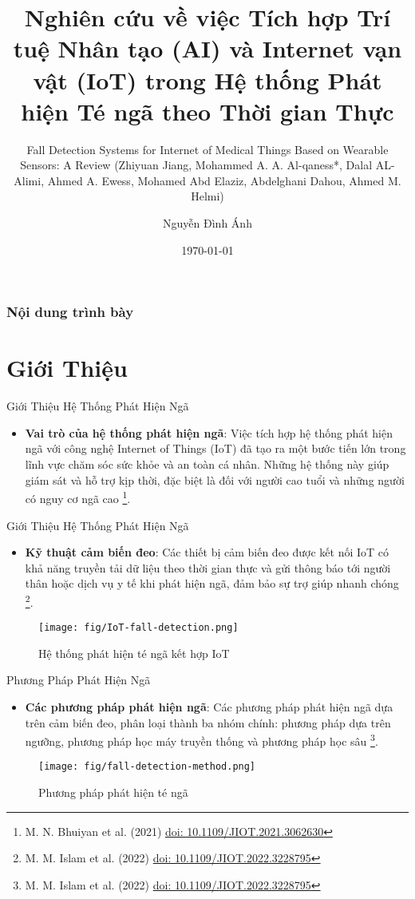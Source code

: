 \documentclass{beamer}
\title[Fall Detection System]
{Nghiên cứu về việc Tích hợp Trí tuệ Nhân tạo (AI) và Internet vạn vật (IoT) trong Hệ thống Phát hiện Té ngã theo Thời gian Thực}
\subtitle{Fall Detection Systems for Internet of Medical Things Based on Wearable Sensors: A Review (Zhiyuan Jiang, Mohammed A. A. Al-qaness*, Dalal AL-Alimi, Ahmed A. Ewess, Mohamed Abd Elaziz, Abdelghani Dahou, Ahmed M. Helmi)}
\author[Nguyen Dinh Anh] %
{Nguyễn Đình Ánh}
\institute[HUTECH] %
{
  Bộ môn Công nghệ phần mềm \\
  Khoa Công nghệ Thông tin\\
  Đại học Công nghệ TP. Hồ Chí Minh (HUTECH)
}
\date[HUTECH 2024] %
{\today}
\newcommand*{\doi}[1]{\href{http://dx.doi.org/#1}{doi: #1}}
\begin{document}
\frame{\titlepage}

\begin{frame}
\frametitle{Nội dung trình bày}
\tableofcontents
\end{frame}


\section{Giới Thiệu}
\begin{frame}{Giới Thiệu Hệ Thống Phát Hiện Ngã}
    \begin{itemize}
    \item \textbf{Vai trò của hệ thống phát hiện ngã}: Việc tích hợp hệ thống phát hiện ngã với công nghệ Internet of Things (IoT) đã tạo ra một bước tiến lớn trong lĩnh vực chăm sóc sức khỏe và an toàn cá nhân. Những hệ thống này giúp giám sát và hỗ trợ kịp thời, đặc biệt là đối với người cao tuổi và những người có nguy cơ ngã cao \footnote{M. N. Bhuiyan et al. (2021) \doi{10.1109/JIOT.2021.3062630}}.      
    \end{itemize}    
\end{frame}

\begin{frame}{Giới Thiệu Hệ Thống Phát Hiện Ngã}

    \begin{itemize}    
    \item \textbf{Kỹ thuật cảm biến đeo}: Các thiết bị cảm biến đeo được kết nối IoT có khả năng truyền tải dữ liệu theo thời gian thực và gửi thông báo tới người thân hoặc dịch vụ y tế khi phát hiện ngã, đảm bảo sự trợ giúp nhanh chóng \footnote{M. M. Islam et al. (2022) \doi{10.1109/JIOT.2022.3228795}}.
    \end{itemize}
    \begin{figure}
        \centering
        \texttt{[image: fig/IoT-fall-detection.png]}
        \caption{Hệ thống phát hiện té ngã kết hợp IoT}
        \label{fig:lstm}
    \end{figure}
\end{frame}

\begin{frame}{Phương Pháp Phát Hiện Ngã}
    \begin{itemize}
    \item \textbf{Các phương pháp phát hiện ngã}: Các phương pháp phát hiện ngã dựa trên cảm biến đeo, phân loại thành ba nhóm chính: phương pháp dựa trên ngưỡng, phương pháp học máy truyền thống và phương pháp học sâu \footnote{M. M. Islam et al. (2022) \doi{10.1109/JIOT.2022.3228795}}.  
    \end{itemize}
    \begin{figure}
        \centering
        \texttt{[image: fig/fall-detection-method.png]}
        \caption{Phương pháp phát hiện té ngã}
        \label{fig:lstm}
    \end{figure}
\end{frame}
\end{document}
